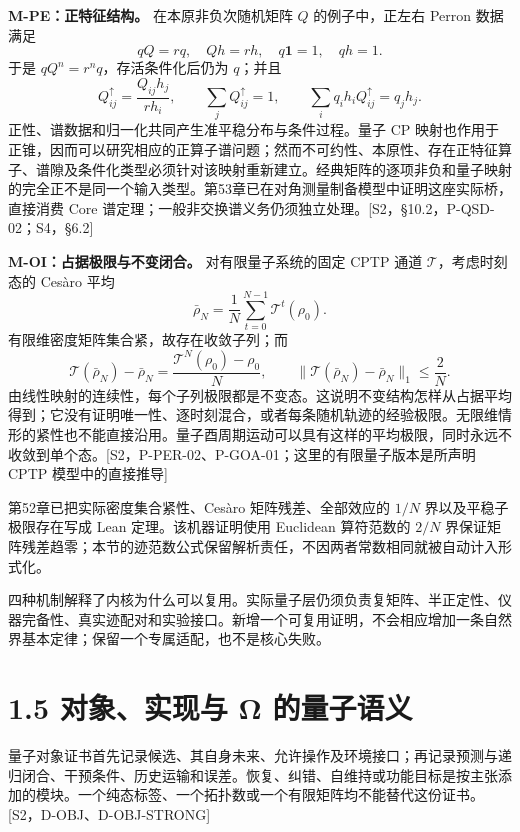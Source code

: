 \documentclass[
  11pt,
  oneside]{book}
\begin{document}
\textbf{M-PE：正特征结构。} 在本原非负次随机矩阵 \(Q\) 的例子中，正左右
Perron 数据满足 \[
qQ=rq,\quad Qh=rh,\quad q\mathbf1=1,\quad qh=1.
\] 于是 \(qQ^n=r^nq\)，存活条件化后仍为 \(q\)；并且 \[
Q^\uparrow_{ij}=\frac{Q_{ij}h_j}{rh_i},\qquad
\sum_jQ^\uparrow_{ij}=1,\qquad
\sum_iq_i h_iQ^\uparrow_{ij}=q_jh_j.
\] 正性、谱数据和归一化共同产生准平稳分布与条件过程。量子 CP
映射也作用于正锥，因而可以研究相应的正算子谱问题；然而不可约性、本原性、存在正特征算子、谱隙及条件化类型必须针对该映射重新建立。经典矩阵的逐项非负和量子映射的完全正不是同一个输入类型。第53章已在对角测量制备模型中证明这座实际桥，直接消费
Core
谱定理；一般非交换谱义务仍须独立处理。{[}S2，§10.2，P-QSD-02；S4，§6.2{]}

\textbf{M-OI：占据极限与不变闭合。} 对有限量子系统的固定 CPTP 通道
\(\mathcal T\)，考虑时刻态的 Cesàro 平均 \[
\bar\rho_N=\frac1N\sum_{t=0}^{N-1}\mathcal T^t(\rho_0).
\] 有限维密度矩阵集合紧，故存在收敛子列；而 \[
\mathcal T(\bar\rho_N)-\bar\rho_N=
\frac{\mathcal T^N(\rho_0)-\rho_0}{N},\qquad
\|\mathcal T(\bar\rho_N)-\bar\rho_N\|_1\le\frac2N.
\]
由线性映射的连续性，每个子列极限都是不变态。这说明不变结构怎样从占据平均得到；它没有证明唯一性、逐时刻混合，或者每条随机轨迹的经验极限。无限维情形的紧性也不能直接沿用。量子酉周期运动可以具有这样的平均极限，同时永远不收敛到单个态。{[}S2，P-PER-02、P-GOA-01；这里的有限量子版本是所声明
CPTP 模型中的直接推导{]}

第52章已把实际密度集合紧性、Cesàro 矩阵残差、全部效应的 \(1/N\)
界以及平稳子极限存在写成 Lean 定理。该机器证明使用 Euclidean 算符范数的
\(2/N\)
界保证矩阵残差趋零；本节的迹范数公式保留解析责任，不因两者常数相同就被自动计入形式化。

四种机制解释了内核为什么可以复用。实际量子层仍须负责复矩阵、半正定性、仪器完备性、真实迹配对和实验接口。新增一个可复用证明，不会相应增加一条自然界基本定律；保留一个专属适配，也不是核心失败。

\hypertarget{ux5bf9ux8c61ux5b9eux73b0ux4e0e-ux3c9-ux7684ux91cfux5b50ux8bedux4e49}{%
\section{1.5 对象、实现与 Ω
的量子语义}\label{ux5bf9ux8c61ux5b9eux73b0ux4e0e-ux3c9-ux7684ux91cfux5b50ux8bedux4e49}}

量子对象证书首先记录候选、其自身未来、允许操作及环境接口；再记录预测与递归闭合、干预条件、历史运输和误差。恢复、纠错、自维持或功能目标是按主张添加的模块。一个纯态标签、一个拓扑数或一个有限矩阵均不能替代这份证书。{[}S2，D-OBJ、D-OBJ-STRONG{]}
\end{document}
